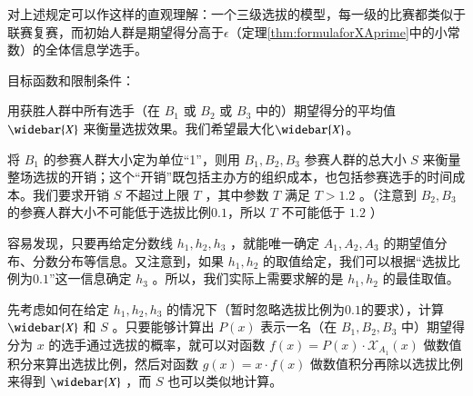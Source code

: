         对上述规定可以作这样的直观理解：一个三级选拔的模型，每一级的比赛都类似于联赛复赛，而初始人群是期望得分高于$\epsilon$（定理\ref{thm:formulaforXAprime}中的小常数）的全体信息学选手。

        \vspace{1.5ex}

        目标函数和限制条件：
        \begin{asparaitem}
            \item 用获胜人群中所有选手（在 $B_1$ 或 $B_2$ 或 $B_3$ 中的）期望得分的平均值 $\widebar{X}$ 来衡量选拔效果。我们希望最大化$\widebar{X}$。
            \item 将 $B_1$ 的参赛人群大小定为单位“1”，则用 $B_1,B_2,B_3$ 参赛人群的总大小 $S$ 来衡量整场选拔的开销；这个“开销”既包括主办方的组织成本，也包括参赛选手的时间成本。我们要求开销 $S$ 不超过上限 $T$ ，其中参数 $T$ 满足 $T>1.2$ 。（注意到 $B_2,B_3$ 的参赛人群大小不可能低于选拔比例$0.1$，所以 $T$ 不可能低于 $1.2$ ）
        \end{asparaitem}

        \vspace{1.5ex}

        容易发现，只要再给定分数线 $h_1,h_2,h_3$ ，就能唯一确定 $A_1,A_2,A_3$ 的期望值分布、分数分布等信息。又注意到，如果 $h_1,h_2$ 的取值给定，我们可以根据“选拔比例为$0.1$”这一信息确定 $h_3$ 。所以，我们实际上需要求解的是 $h_1,h_2$ 的最佳取值。

        先考虑如何在给定 $h_1,h_2,h_3$ 的情况下（暂时忽略选拔比例为$0.1$的要求），计算 $\widebar{X}$ 和 $S$ 。只要能够计算出 $P(x)$ 表示一名（在 $B_1,B_2,B_3$ 中）期望得分为 $x$ 的选手通过选拔的概率，就可以对函数 $f(x)=P(x)\cdot\mathcal{X}_{A_1}(x)$ 做数值积分来算出选拔比例，然后对函数 $g(x)=x\cdot f(x)$ 做数值积分再除以选拔比例来得到 $\widebar{X}$ ，而 $S$ 也可以类似地计算。
        
